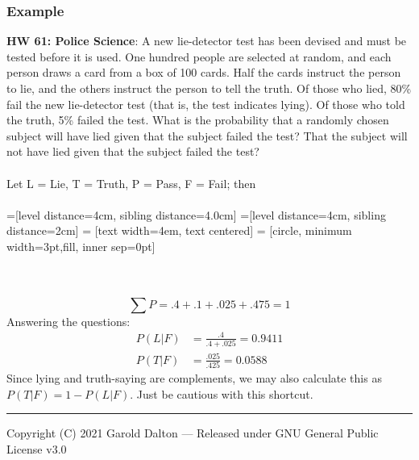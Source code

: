 \documentclass[14pt]{extarticle}
\begin{document}
\subsubsection{Example} 
\textbf{HW 61: Police Science}: A new lie-detector test has been devised and must be tested before it is used. One hundred people are selected at random, and each person draws a card from a box of 100 cards. Half the cards instruct the person to lie, and the others instruct the person to tell the truth. Of those who lied, 80\% fail the new lie-detector test (that is, the test indicates lying). Of those who told the truth, 5\% failed the test. What is the probability that a randomly chosen subject will have lied given that the subject failed the test? That the subject will not have lied given that the subject failed the test?
\\\\
Let L = Lie, T = Truth, P = Pass, F = Fail; then
\\\\

=[level distance=4cm, sibling distance=4.0cm]
=[level distance=4cm, sibling distance=2cm]
 = [text width=4em, text centered]
 = [circle, minimum width=3pt,fill, inner sep=0pt]

\\\\
$$\sum P = .4+.1+.025+.475 = 1$$
Answering the questions:
\begin{align*}
	P(L|F) &= \frac{.4}{.4+.025}= 0.9411 \\
	P(T|F) &= \frac{.025}{.425} = 0.0588
\end{align*}
Since lying and truth-saying are complements, we may also calculate this as $P(T|F) = 1 - P(L|F)$. Just be cautious with this shortcut.

\noindent\rule{\textwidth}{1pt}
{\footnotesize Copyright (C) 2021 Garold Dalton --- Released under GNU General Public License v3.0}


\cleardoublepage
\end{document}
